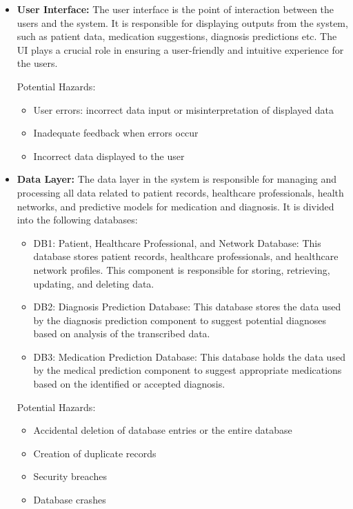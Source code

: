 \documentclass{article}
\begin{document}
\begin{itemize}
    \item \textbf{User Interface:}
    The user interface is the point of interaction between the users and the system. It is responsible for displaying outputs from the system, such as patient data, medication suggestions, diagnosis predictions etc. The UI plays a crucial role in ensuring a user-friendly and intuitive experience for the users.
    

    Potential Hazards:
    \begin{itemize}
        \item User errors: incorrect data input or misinterpretation of displayed data
        \item Inadequate feedback when errors occur
        \item Incorrect data displayed to the user
    \end{itemize}

    \item \textbf{Data Layer:}
    The data layer in the system is responsible for managing and processing all data related to patient records, healthcare professionals, health networks, and predictive models for medication and diagnosis. It is divided into the following databases:
    \begin{itemize}
        \item DB1: Patient, Healthcare Professional, and Network Database: This database stores patient records, healthcare professionals, and healthcare network profiles. This component is responsible for storing, retrieving, updating, and deleting data. 

        \item DB2: Diagnosis Prediction Database: This database stores the data used by the diagnosis prediction component to suggest potential diagnoses based on analysis of the transcribed data.

        \item DB3: Medication Prediction Database: This database holds the data used by the medical prediction component to suggest appropriate medications based on the identified or accepted diagnosis.
    \end{itemize}

    Potential Hazards:
    \begin{itemize}
        \item Accidental deletion of database entries or the entire database
        \item Creation of duplicate records
        \item Security breaches
        \item Database crashes   
    \end{itemize}
    
\end{itemize}
\end{document}
